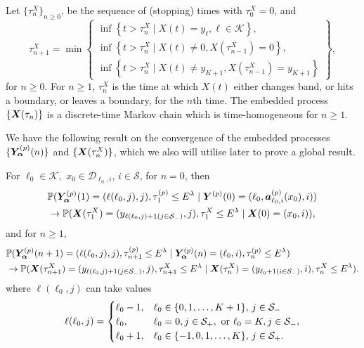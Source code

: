 Let \(\{\tau_n^X\}_{n\geq 0}\), be the sequence of (stopping) times with \(\tau_0^X=0\), and 
\[\tau_{n+1}^X = \min\left\{\begin{array}{c}\inf\left\{t>\tau_n^X\mid X(t)=y_{\ell}, \ell\in\mathcal K\right\}, \\ \inf\left\{t>\tau_n^X \mid X(t) \neq 0, X(\tau_{n-1}^X)=0\right\}, \\ \inf\left\{t>\tau_n^X \mid X(t) \neq y_{K+1}, X(\tau_{n-1}^X)=y_{K+1}\right\} \end{array} \right\},\]
for \(n\geq 0\). For \(n\geq 1\), \(\tau_n^X\) is the time at which \(X(t)\) either changes band, or hits a boundary, or leaves a boundary, for the \(n\)th time. The embedded process \(\{\boldsymbol X(\tau_n)\}\) is a discrete-time Markov chain which is time-homogeneous for \(n\geq 1\). 

We have the following result on the convergence of the embedded processes \(\{\bm{Y}_{\bm{\alpha}}^{(p)}(n)\}\) and \(\{\boldsymbol X(\tau_n^X)\}\), which we also will utilise later to prove a global result.
\begin{cor}\label{cor: aln222222} For \(\ell_0\in\mathcal K,\) \(x_0\in\mathcal D_{\ell_0,i}\), \(i\in\mathcal S\), 
	for \(n=0\), then
	\begin{align}
		&\mathbb P(\bm{Y}_{\bm{\alpha}}^{(p)}(1) = (\ell(\ell_0,j),j), \tau_1^{(p)}\leq E^\lambda
            	 \mid \boldsymbol Y^{(p)}(0) = (\ell_0,\boldsymbol a_{\ell_0,i}^{(p)}(x_0),i)) \nonumber
		\\&\to  
			\mathbb P(\boldsymbol X(\tau_1^X) = (y_{\ell(\ell_0,j)+1(j\in\mathcal{S}_-)}, j), \tau_1^{X}\leq E^\lambda \mid \boldsymbol X(0) = (x_0,i)),\label{eqn: lim 1}
	\end{align}
	and for \(n\geq 1\), 
	\begin{align}
		&\mathbb P(\bm{Y}_{\bm{\alpha}}^{(p)}(n+1) = (\ell(\ell_0,j),j), \tau_{n+1}^{(p)}\leq E^\lambda
            	 \mid \bm{Y}_{\bm{\alpha}}^{(p)}(n) = (\ell_0,i), \tau_n^{(p)}\leq E^\lambda) \nonumber
		\\&\to  
			\mathbb P(\boldsymbol X(\tau_{n+1}^X) = (y_{\ell(\ell_0,j)+1(j\in\mathcal{S}_-)}, j), \tau_{n+1}^{X}\leq E^\lambda \mid \boldsymbol X(\tau_{n}^X) = (y_{\ell_0+1(i\in\mathcal{S}_-)},i), \tau_n^{X}\leq E^\lambda).\label{eqn: ddddddd}
	\end{align}
	where \(\ell(\ell_0,j)\) can take values
	\begin{align}
		\ell(\ell_0,j) = \begin{cases}
			\ell_0-1, & \ell_0\in\{0,1,\dots,K+1\},\, j\in\mathcal{S}_-\\
			\ell_0, & \ell_0 = 0, j\in\mathcal S_+, \mbox{ or }\ell_0 = K, j\in\mathcal S_-,\\
			\ell_0+1, & \ell_0\in\{-1,0,1,\dots,K\},\, j\in\mathcal{S}_+.
		\end{cases}
	\end{align}
\end{cor}
